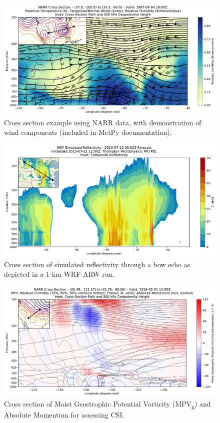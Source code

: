 \documentclass[final]{beamer}
\newlength{\colwidth}
\begin{document}
\begin{frame}[t, fragile]
\begin{columns}[t]
\begin{column}{\colwidth}
\begin{exampleblock}
    \begin{figure}
      \centering
      \includegraphics[width=\colwidth]{figures/basic_example_narr.pdf}
      \caption{Cross section example using NARR data, with demonstration of wind components (included in MetPy documentation).}
    \end{figure}
    \begin{figure}
      \centering
      \includegraphics[width=\colwidth]{figures/wrf_refl.pdf}
      \caption{Cross section of simulated reflectivity through a bow echo as depicted in a 1-km WRF-ARW run.}
    \end{figure}
    \begin{figure}
      \centering
      \includegraphics[width=\colwidth]{figures/csi_example_narr.pdf}
      \caption{Cross section of Moist Geostrophic Potential Vorticity (MPV\textsubscript{g}) and Absolute Momentum for assessing CSI.}
    \end{figure}


\end{exampleblock}
\end{column}
\end{columns}
\end{frame}
\end{document}
